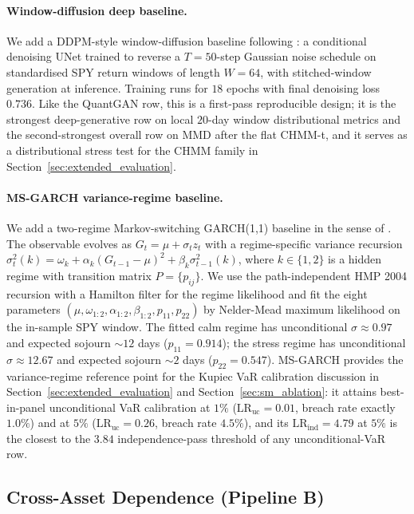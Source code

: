 \paragraph{Window-diffusion deep baseline.}
\label{sec:diffusion_methods}%
We add a DDPM-style window-diffusion baseline following \citet{ho2020denoising, rasul2021autoregressive}: a conditional denoising UNet trained to reverse a $T = 50$-step Gaussian noise schedule on standardised SPY return windows of length $W = 64$, with stitched-window generation at inference.
Training runs for $18$ epochs with final denoising loss $0.736$.
Like the QuantGAN row, this is a first-pass reproducible design; it is the strongest deep-generative row on local $20$-day window distributional metrics and the second-strongest overall row on MMD after the flat CHMM-t, and it serves as a distributional stress test for the CHMM family in Section~\ref{sec:extended_evaluation}.

\paragraph{MS-GARCH variance-regime baseline.}
\label{sec:msgarch_methods}%
We add a two-regime Markov-switching GARCH(1,1) baseline in the sense of \citet{haas2004new}.
The observable evolves as $G_t = \mu + \sigma_t z_t$ with a regime-specific variance recursion $\sigma_t^2(k) = \omega_k + \alpha_k (G_{t-1} - \mu)^2 + \beta_k \sigma_{t-1}^2(k)$, where $k \in \{1, 2\}$ is a hidden regime with transition matrix $P = \{p_{ij}\}$.
We use the path-independent HMP 2004 recursion with a Hamilton filter for the regime likelihood and fit the eight parameters $(\mu, \omega_{1:2}, \alpha_{1:2}, \beta_{1:2}, p_{11}, p_{22})$ by Nelder-Mead maximum likelihood on the in-sample SPY window.
The fitted calm regime has unconditional $\sigma \approx 0.97$ and expected sojourn $\sim 12$ days ($p_{11} = 0.914$); the stress regime has unconditional $\sigma \approx 12.67$ and expected sojourn $\sim 2$ days ($p_{22} = 0.547$).
MS-GARCH provides the variance-regime reference point for the Kupiec VaR calibration discussion in Section~\ref{sec:extended_evaluation} and Section~\ref{sec:sm_ablation}: it attains best-in-panel unconditional VaR calibration at $1\%$ ($\text{LR}_{\text{uc}} = 0.01$, breach rate exactly $1.0\%$) and at $5\%$ ($\text{LR}_{\text{uc}} = 0.26$, breach rate $4.5\%$), and its $\text{LR}_{\text{ind}} = 4.79$ at $5\%$ is the closest to the $3.84$ independence-pass threshold of any unconditional-VaR row.

\subsection{Cross-Asset Dependence (Pipeline B)}
\label{sec:cross_asset_methods}

